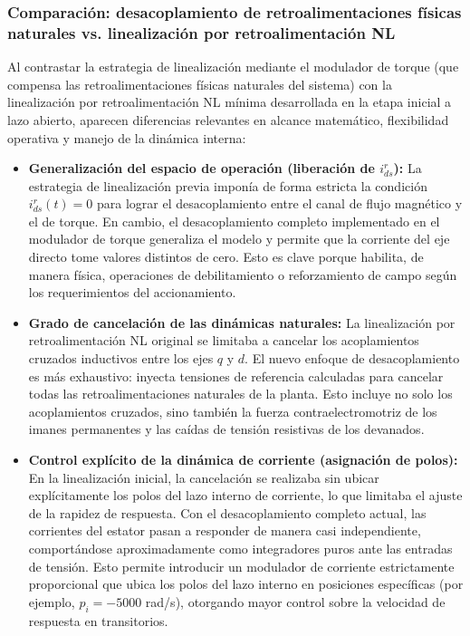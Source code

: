 \documentclass[12pt, a4paper,journal, onecolumn, compsoc]{IEEEtran}
\begin{document}
\subsubsection{Comparación: desacoplamiento de retroalimentaciones físicas naturales vs. linealización por retroalimentación NL}

Al contrastar la estrategia de linealización mediante el modulador de torque (que compensa las retroalimentaciones físicas naturales del sistema) con la linealización por retroalimentación NL mínima desarrollada en la etapa inicial a lazo abierto, aparecen diferencias relevantes en alcance matemático, flexibilidad operativa y manejo de la dinámica interna:

\begin{itemize}
    \item \textbf{Generalización del espacio de operación (liberación de $i_{ds}^r$):} 
    La estrategia de linealización previa imponía de forma estricta la condición $i_{ds}^r(t)=0$ para lograr el desacoplamiento entre el canal de flujo magnético y el de torque. En cambio, el desacoplamiento completo implementado en el modulador de torque generaliza el modelo y permite que la corriente del eje directo tome valores distintos de cero. Esto es clave porque habilita, de manera física, operaciones de debilitamiento o reforzamiento de campo según los requerimientos del accionamiento.
    
    \item \textbf{Grado de cancelación de las dinámicas naturales:} 
    La linealización por retroalimentación NL original se limitaba a cancelar los acoplamientos cruzados inductivos entre los ejes $q$ y $d$. El nuevo enfoque de desacoplamiento es más exhaustivo: inyecta tensiones de referencia calculadas para cancelar todas las retroalimentaciones naturales de la planta. Esto incluye no solo los acoplamientos cruzados, sino también la fuerza contraelectromotriz de los imanes permanentes y las caídas de tensión resistivas de los devanados.
    
    \item \textbf{Control explícito de la dinámica de corriente (asignación de polos):} 
    En la linealización inicial, la cancelación se realizaba sin ubicar explícitamente los polos del lazo interno de corriente, lo que limitaba el ajuste de la rapidez de respuesta. Con el desacoplamiento completo actual, las corrientes del estator pasan a responder de manera casi independiente, comportándose aproximadamente como integradores puros ante las entradas de tensión. Esto permite introducir un modulador de corriente estrictamente proporcional que ubica los polos del lazo interno en posiciones específicas (por ejemplo, $p_i=-5000$ rad/s), otorgando mayor control sobre la velocidad de respuesta en transitorios.
\end{itemize}
\end{document}
